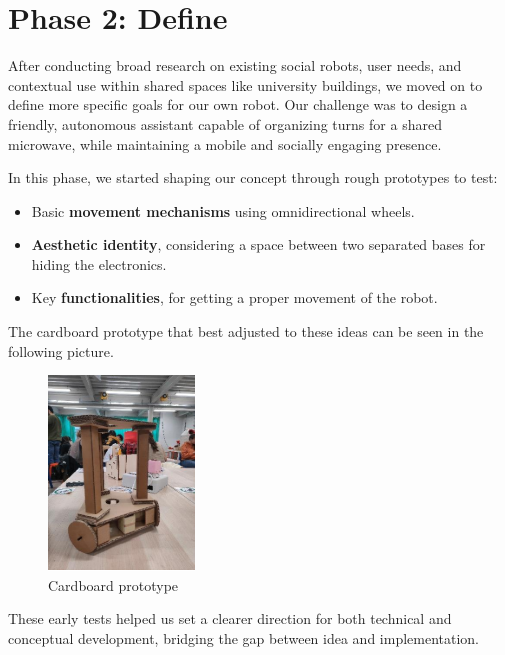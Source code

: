 \section{Phase 2: Define}

After conducting broad research on existing social robots, user needs, and contextual use within shared spaces like university buildings, we moved on to define more specific goals for our own robot. Our challenge was to design a friendly, autonomous assistant capable of organizing turns for a shared microwave, while maintaining a mobile and socially engaging presence.

In this phase, we started shaping our concept through rough prototypes to test:

\begin{itemize}
    \item Basic \textbf{movement mechanisms} using omnidirectional wheels.
    \item \textbf{Aesthetic identity}, considering a space between two separated bases for hiding the electronics.
    \item Key \textbf{functionalities}, for getting a proper movement of the robot.
\end{itemize}

The cardboard prototype that best adjusted to these ideas can be seen in the following picture.

\begin{figure}[H]
    \centering
    \includegraphics[width=0.5\linewidth]{../ReportMovementModule/images/Aspose.Words.728084da-df58-4b9d-a372-f65cffbdb23d.006.png}
    \caption{Cardboard prototype}
\end{figure}

These early tests helped us set a clearer direction for both technical and conceptual development, bridging the gap between idea and implementation.
